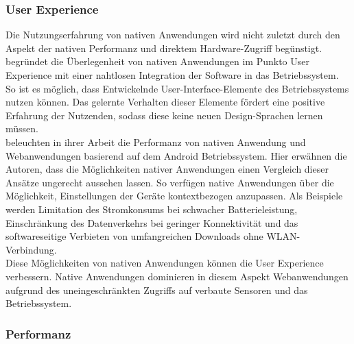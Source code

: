 \documentclass[a4paper]{scrartcl}
\begin{document}
\subsubsection{User Experience}

Die Nutzungserfahrung von nativen Anwendungen wird nicht zuletzt durch den Aspekt der nativen Performanz und direktem Hardware-Zugriff begünstigt. \textcite[28]{Jobe} begründet die Überlegenheit von nativen Anwendungen im Punkto User Experience mit einer nahtlosen Integration der Software in das Betriebssystem. So ist es möglich, dass Entwickelnde User-Interface-Elemente des Betriebssystems nutzen können. Das gelernte Verhalten dieser Elemente fördert eine positive Erfahrung der Nutzenden, sodass diese keine neuen Design-Sprachen lernen müssen. \\
\textcite[1001]{native_vs_web} beleuchten in ihrer Arbeit die Performanz von nativen Anwendung und Webanwendungen basierend auf dem Android Betriebssystem. Hier erwähnen die Autoren, dass die Möglichkeiten nativer Anwendungen einen Vergleich dieser Ansätze ungerecht aussehen lassen. So verfügen native Anwendungen über die Möglichkeit, Einstellungen der Geräte kontextbezogen anzupassen. Als Beispiele werden Limitation des Stromkonsums bei schwacher Batterieleistung, Einschränkung des Datenverkehrs bei geringer Konnektivität und das softwareseitige Verbieten von umfangreichen Downloads ohne WLAN-Verbindung. \\
Diese Möglichkeiten von nativen Anwendungen können die User Experience verbessern. Native Anwendungen dominieren in diesem Aspekt Webanwendungen aufgrund des uneingeschränkten Zugriffs auf verbaute Sensoren und das Betriebssystem.

\subsubsection{Performanz}
\end{document}
